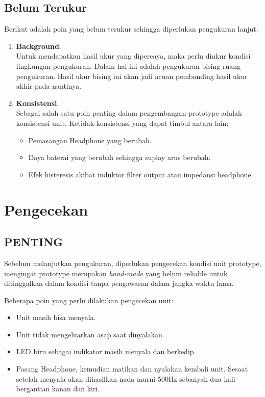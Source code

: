 \documentclass[12pt,]{article}
\begin{document}
	\newpage
	\subsection{Belum Terukur}
	
	Berikut adalah poin yang belum terukur sehingga diperlukan pengukuran lanjut:
	\begin{enumerate}
		\item \textbf{Background}.\\
		Untuk mendapatkan hasil ukur yang dipercaya, maka perlu diukur kondisi lingkungan pengukuran.
		Dalam hal ini adalah pengukuran bising ruang pengukuran.
		Hasil ukur bising ini akan jadi acuan pembanding hasil ukur akhir pada nantinya.
		
		\item \textbf{Konsistensi}.\\
		Sebagai salah satu poin penting dalam pengembangan prototype adalah konsistensi unit.
		Ketidak-konsistensi yang dapat timbul antara lain:
		\begin{itemize}
			\item Pemasangan Headphone yang berubah.
			\item Daya baterai yang berubah sehingga suplay arus berubah.
			\item Efek histeresis akibat induktor filter output atau impedansi headphone.
		\end{itemize}
		
	\end{enumerate}

	\newpage
	\section{Pengecekan}
	
	\subsection{PENTING}
	
	Sebelum melanjutkan pengukuran, diperlukan pengecekan kondisi unit prototype,
	mengingat prototype merupakan \textit{hand-made} yang belum reliable untuk ditinggalkan dalam
	kondisi tanpa pengawasan dalam jangka waktu lama.
	
	Beberapa poin yang perlu dilakukan pengecekan unit:
	\begin{itemize}
		\item Unit masih bisa menyala.
		\item Unit tidak mengeluarkan asap saat dinyalakan.
		\item LED biru sebagai indikator masih menyala dan berkedip.
		\item Pasang Headphone, kemudian matikan dan nyalakan kembali unit. Sesaat setelah menyala
		akan dihasilkan nada murni 500Hz sebanyak dua kali bergantian kanan dan kiri.
	\end{itemize}
	
\end{document}
